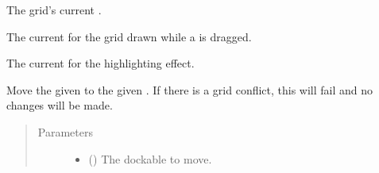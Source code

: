 \documentclass[letterpaper,10pt,english,openany,oneside]{sphinxmanual}
\begin{document}
\begin{fulllineitems}
\begin{fulllineitems}
\begin{quote}
\begin{description}
\end{description}\end{quote}

\end{fulllineitems}


\begin{fulllineitems}
\label{\detokenize{api:spookyconsole.gui.core.Grid.geometry}}
The grid’s current .

\end{fulllineitems}


\begin{fulllineitems}
\label{\detokenize{api:spookyconsole.gui.core.Grid.grid_visual}}
The current  for the grid drawn while a  is dragged.

\end{fulllineitems}


\begin{fulllineitems}
\label{\detokenize{api:spookyconsole.gui.core.Grid.highlight_visual}}
The current  for the highlighting effect.

\end{fulllineitems}


\begin{fulllineitems}
\label{\detokenize{api:spookyconsole.gui.core.Grid.move_dockable}}
Move the given   to the given  . If there is a grid conflict, this
will fail and no changes will be made.
\begin{quote}\begin{description}
\item[{Parameters}] \leavevmode\begin{itemize}
\item {} 
 () \textendash{} The dockable to move.


\end{itemize}
\end{description}
\end{quote}
\end{fulllineitems}
\end{fulllineitems}
\end{document}
